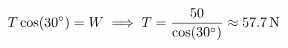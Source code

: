 \documentclass[preview]{standalone}
\begin{document}
\begin{align*}
\special{dvisvgm:raw <g id='unique000'>}T \cos(30^{\circ}) = W \implies T = \frac{50}{\cos(30^{\circ})} \approx 57.7\,\mathrm{N}\special{dvisvgm:raw </g>}
\end{align*}
\end{document}
